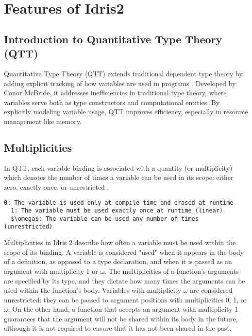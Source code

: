\documentclass[]{rptuseminar}
\begin{document}
\section{Features of Idris2}  
\label{sec:features}
\subsection{Introduction to Quantitative Type Theory (QTT)}
Quantitative Type Theory (QTT) extends traditional dependent type theory by adding explicit tracking of how variables are used in programs \cite{atkey2018syntax}. Developed by Conor McBride, it addresses inefficiencies in traditional type theory, where variables serve both as type constructors and computational entities. By explicitly modeling variable usage, QTT improves efficiency, especially in resource management like memory.
\subsection{Multiplicities}
In QTT,
each variable binding is associated with a quantity (or multiplicity) which denotes the number
of times a variable can be used in its scope: either zero, exactly once, or unrestricted \cite{atkey2018syntax}.

\begin{lstlisting}[mathescape=true]
  0: The variable is used only at compile time and erased at runtime
  1: The variable must be used exactly once at runtime (linear)
  $\omega$: The variable can be used any number of times (unrestricted)
\end{lstlisting}
\vspace{1em}  %

Multiplicities in Idris 2 describe how often a variable must be used within the scope of its binding. A variable is considered "used" when it appears in the body of a definition, as opposed to a type declaration, and when it is passed as an argument with multiplicity 1 or \(\omega\). The multiplicities of a function's arguments are specified by its type, and they dictate how many times the arguments can be used within the function's body. Variables with multiplicity \(\omega\) are considered unrestricted: they can be passed to argument positions with multiplicities 0, 1, or \(\omega\). On the other hand, a function that accepts an argument with multiplicity 1 guarantees that the argument will not be shared within its body in the future, although it is not required to ensure that it has not been shared in the past\cite{brady2021idris}.
\end{document}
